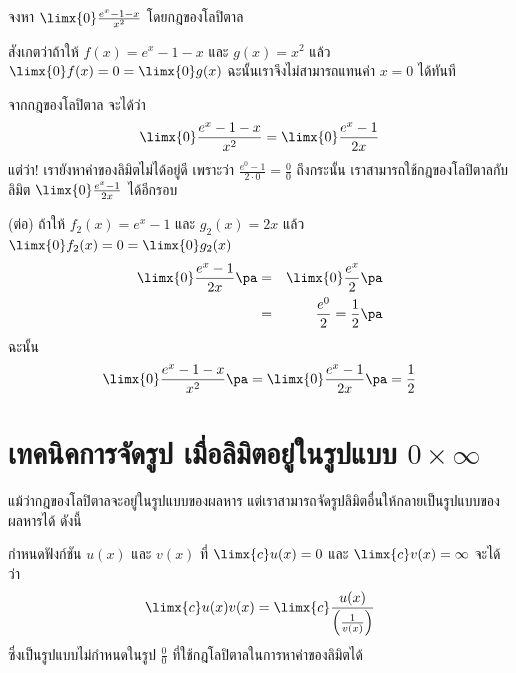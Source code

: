 \begin{frame}[t]
\begin{ex}
จงหา $\limx{0} \frac{e^x-1-x}{x^2}$ โดยกฎของโลปิตาล
\end{ex}\pa 
\begin{sol}
สังเกตว่าถ้าให้ $f(x) = e^x-1-x$ และ $g(x) = x^2$ \pa แล้ว $\limx{0} f(x) = 0 = \limx{0} g(x)$ ฉะนั้นเราจึงไม่สามารถแทนค่า $x=0$ ได้ทันที \pa

จากกฎของโลปิตาล จะได้ว่า \pa
\[ \limx{0} \frac{e^x-1-x}{x^2} = \limx{0} \frac{e^x-1}{2x} \] \pa
แต่ว่า! เรายังหาค่าของลิมิตไม่ได้อยู่ดี เพราะว่า $\frac{e^0 - 1}{2\cdot 0} = \frac{0}{0}$ \pa ถึงกระนั้น เราสามารถใช้กฎของโลปิตาลกับลิมิต $\limx{0} \frac{e^x-1}{2x}$ ได้อีกรอบ
\end{sol}
\end{frame}

\begin{frame}[t]
\begin{sol} (ต่อ)
ถ้าให้ $f_2(x) = e^x-1$ และ $g_2(x) = 2x$ \pa แล้ว $\limx{0} f_2(x) = 0 = \limx{0} g_2(x)$
\begin{eqnarray*}
\limx{0} \frac{e^x-1}{2x} \pa &=& \limx{0} \frac{e^x}{2}\pa \\
&=& \frac{e^0}{2} = \frac{1}{2} \pa
\end{eqnarray*}
ฉะนั้น 
\[ \limx{0} \frac{e^x-1-x}{x^2} \pa = \limx{0} \frac{e^x-1}{2x} \pa = \frac{1}{2} \]
\end{sol}
\end{frame}

\section[$0 \times \infty$]{เทคนิคการจัดรูป เมื่อลิมิตอยู่ในรูปแบบ $0 \times \infty$}
\frame{\sectionpage}

\begin{frame}
แม้ว่ากฎของโลปิตาลจะอยู่ในรูปแบบของผลหาร แต่เราสามารถจัดรูปลิมิตอื่นให้กลายเป็นรูปแบบของผลหารได้ ดังนี้
\begin{thm}{}{}
กำหนดฟังก์ชัน $u(x)$ และ $v(x)$ ที่ $\limx{c} u(x) = 0$ และ $\limx{c} v(x) = \infty$ จะได้ว่า
\begin{equation}
\limx{c} u(x) v(x) = \limx{c} \frac{u(x)}{\left( \frac{1}{v(x)} \right)}
\end{equation} \pa
ซึ่งเป็นรูปแบบไม่กำหนดในรูป $\frac{0}{0}$ ที่ใช้กฎโลปิตาลในการหาค่าของลิมิตได้
\end{thm}
\end{frame}


